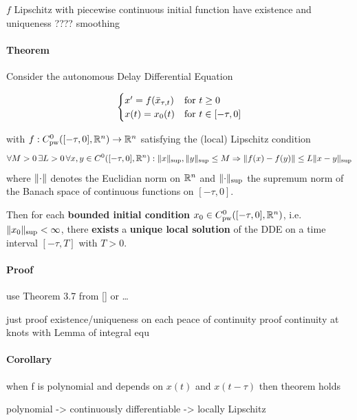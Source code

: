 \documentclass[10pt]{article}
\begin{document}
$f$ Lipschitz with piecewise continuous initial function have existence and uniqueness ???? smoothing

\paragraph{Theorem}\label{theorem}
Consider the autonomous Delay Differential Equation



\begin{equation}
    \begin{cases}
        x'=f(\bar{x}_{\tau,t}) & \text{for } t\geq 0\\
        x(t)=x_0(t)     & \text{for } t\in [-\tau,0]
    \end{cases}
\end{equation}

with $f:C^0_\text{pw}([-\tau,0],\mathbb{R}^n)\rightarrow\mathbb{R}^n$ satisfying the (local) Lipschitz condition
\begin{equation}
    \forall M>0\,\exists L>0\,\forall x,y\in C^0([-\tau,0],\mathbb{R}^n) : \lVert x\rVert_{\text{\scriptsize{sup}}},\lVert y\rVert_{\text{\scriptsize{sup}}}\leq M\Rightarrow\lVert f(x)-f(y)\rVert \leq L\lVert x-y\rVert_{\text{\scriptsize{sup}}}
\end{equation}
where $\lVert\cdot\rVert$ denotes the Euclidian norm on $\mathbb{R}^n$ and $\lVert\cdot\rVert_{\text{\scriptsize{sup}}}$ the supremum norm of the Banach space of continuous functions on $[-\tau,0]$.

Then for each \textbf{bounded initial condition} $x_0\in C^0_\text{pw}([-\tau,0],\mathbb{R}^n)$, i.e.\ $\lVert x_0\rVert_{\text{\scriptsize{sup}}}< \infty$, there \textbf{exists} a \textbf{unique local solution} of the DDE on a time interval $[-\tau, T]$ with $T>0$.

\paragraph{Proof}\label{proof-1}
use Theorem 3.7 from {[}{]} or \ldots{}

just proof existence/uniqueness on each peace of continuity proof continuity at knots with Lemma of integral equ

\paragraph{Corollary}\label{corollary}
when f is polynomial and depends on $x(t)$ and $x(t-\tau)$ then theorem holds

polynomial -\textgreater{} continuously differentiable -\textgreater{} locally Lipschitz
\end{document}
